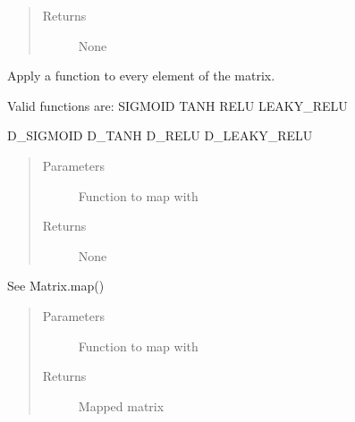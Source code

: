 \documentclass[letterpaper,10pt,english]{sphinxmanual}
\begin{document}
\begin{fulllineitems}
\begin{fulllineitems}
\begin{quote}
\begin{description}
\item[{Returns}] \leavevmode
None

\end{description}\end{quote}

\end{fulllineitems}


\begin{fulllineitems}
\label{\detokenize{libpymath.matrix:libpymath.matrix.matrix.Matrix.map}}
Apply a function to every element of the matrix.

Valid functions are:
SIGMOID
TANH
RELU
LEAKY\_RELU

D\_SIGMOID
D\_TANH
D\_RELU
D\_LEAKY\_RELU
\begin{quote}\begin{description}
\item[{Parameters}] \leavevmode
{} \textendash{} Function to map with

\item[{Returns}] \leavevmode
None

\end{description}\end{quote}

\end{fulllineitems}


\begin{fulllineitems}
\label{\detokenize{libpymath.matrix:libpymath.matrix.matrix.Matrix.mapped}}
See Matrix.map()
\begin{quote}\begin{description}
\item[{Parameters}] \leavevmode
{} \textendash{} Function to map with

\item[{Returns}] \leavevmode
Mapped matrix

\end{description}\end{quote}


\end{fulllineitems}
\end{fulllineitems}
\end{document}

